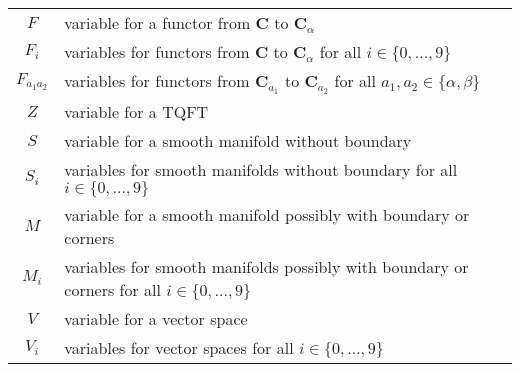 \begin{longtable}{cl}
  \\[6pt]
  $F$
  &
  variable for a functor from $\mathbf{C}$ to $\mathbf{C}_{\alpha}$
  \\[6pt]
  $F_{i}$
  &
  variables for functors from $\mathbf{C}$ to $\mathbf{C}_{\alpha}$
  for all $i \in \lbrace 0,\ldots,9 \rbrace$
  \\[6pt]
  $F_{a_{1}a_{2}}$
  &
  variables for functors from $\mathbf{C}_{a_{1}}$ to $\mathbf{C}_{a_{2}}$
  for all $a_{1},a_{2} \in \lbrace \alpha,\beta \rbrace$
  \\[6pt]
  $Z$
  &
  variable for a TQFT
  \\[6pt]
  $S$
  &
  variable for a smooth manifold
  without boundary
  \\[6pt]
  $S_{i}$
  &
  variables for smooth manifolds
  without boundary
  for all $i \in \lbrace 0,\ldots,9 \rbrace$
  \\[6pt]
  $M$
  &
  variable for a smooth manifold
  possibly with boundary or corners
  \\[6pt]
  $M_{i}$
  &
  variables for smooth manifolds
  possibly with boundary or corners
  for all $i \in \lbrace 0,\ldots,9 \rbrace$
  \\[6pt]
  $V$
  &
  variable for a vector space
  \\[6pt]
  $V_{i}$
  &
  variables for vector spaces
  for all $i \in \lbrace 0,\ldots,9 \rbrace$
  \\
  \hline
\end{longtable}
